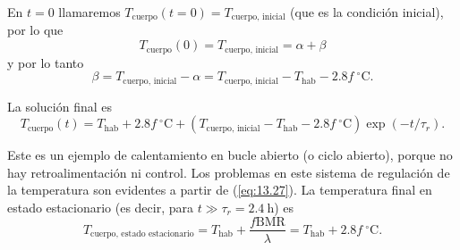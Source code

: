 \documentclass[12pt]{book}
\begin{document}
En $t = 0$ llamaremos $T_{\text{cuerpo}}(t = 0) = T_{\text{cuerpo, inicial}}$ (que es la condición inicial), por lo que
\begin{equation}
  T_{\text{cuerpo}}(0) = T_{\text{cuerpo, inicial}} = \alpha + \beta \label{eq:13.25}
\end{equation}
y por lo tanto
\begin{equation}
  \beta = T_{\text{cuerpo, inicial}} - \alpha = T_{\text{cuerpo, inicial}} - T_{\text{hab}} - 2.8 f\ ^\circ\text{C}. \label{eq:13.26}
\end{equation}

La solución final es
\begin{equation}
  T_{\text{cuerpo}}(t) = T_{\text{hab}} + 2.8 f\ ^\circ\text{C} + (T_{\text{cuerpo, inicial}} - T_{\text{hab}} - 2.8 f\ ^\circ\text{C}) \exp(-t/\tau_r). \label{eq:13.27}
\end{equation}

Este es un ejemplo de calentamiento en bucle abierto (o ciclo abierto), porque no hay retroalimentación ni control. Los problemas en este sistema de regulación de la temperatura son evidentes a partir de (\ref{eq:13.27}). La temperatura final en estado estacionario (es decir, para $t \gg \tau_r = 2.4\ \text{h}$) es
\begin{equation}
  T_{\text{cuerpo, estado estacionario}} = T_{\text{hab}} + \frac{f \text{BMR}}{\lambda} = T_{\text{hab}} + 2.8 f\ ^\circ\text{C}. \label{eq:13.28}
\end{equation}
\end{document}
